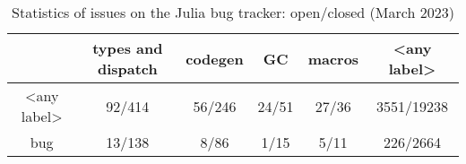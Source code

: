 \begin{table}[t]
\caption{Statistics of issues on the Julia bug tracker: open/closed (March 2023)}\label{tab:julia-issues-stats}
\vspace*{0.25em}
\centering\footnotesize
\begin{tabular}{c|ccccc}
 & types and dispatch & codegen & GC & macros & <any label> \\
\midrule
<any label> &
  92/414 & 56/246 & 24/51 & 27/36 & 3551/19238 \\
bug &
  13/138 & 8/86 & 1/15 & 5/11 & 226/2664
\end{tabular}
\end{table}




%



